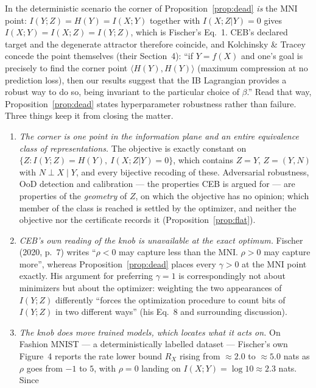 \begin{remark}\label{rem:mni}
In the deterministic scenario the corner of Proposition~\ref{prop:dead} \emph{is} the MNI
point: $I(Y;Z) = H(Y) = I(X;Y)$ together with $I(X;Z|Y) = 0$ gives
$I(X;Y) = I(X;Z) = I(Y;Z)$, which is Fischer's Eq.~1. CEB's declared target and the
degenerate attractor therefore coincide, and Kolchinsky \& Tracey concede the point
themselves (their Section~4): ``if $Y = f(X)$ and one's goal is precisely to find the corner
point $\langle H(Y), H(Y)\rangle$ (maximum compression at no prediction loss), then our
results suggest that the IB Lagrangian provides a robust way to do so, being invariant to
the particular choice of $\beta$.'' Read that way, Proposition~\ref{prop:dead} states
hyperparameter robustness rather than failure. Three things keep it from closing the matter.
\begin{enumerate}
\item[(i)] \emph{The corner is one point in the information plane and an entire equivalence
class of representations.} The objective is exactly constant on
$\{Z : I(Y;Z) = H(Y),\ I(X;Z|Y) = 0\}$, which contains $Z = Y$, $Z = (Y,N)$ with
$N \perp X \mid Y$, and every bijective recoding of these. Adversarial robustness, OoD
detection and calibration --- the properties CEB is argued for --- are properties of the
\emph{geometry} of $Z$, on which the objective has no opinion; which member of the class is
reached is settled by the optimizer, and neither the objective nor the
certificate records it (Proposition~\ref{prop:flat}).
\item[(ii)] \emph{CEB's own reading of the knob is unavailable at the exact optimum.}
Fischer (2020, p.~7) writes ``$\rho < 0$ may capture less than the MNI. $\rho > 0$ may
capture more'', whereas Proposition~\ref{prop:dead} places every $\gamma > 0$ at the MNI
point exactly. His argument for preferring $\gamma = 1$ is correspondingly not about
minimizers but about the optimizer: weighting the two appearances of $I(Y;Z)$ differently
``forces the optimization procedure to count bits of $I(Y;Z)$ in two different ways'' (his
Eq.~8 and surrounding discussion).
\item[(iii)] \emph{The knob does move trained models, which locates what it acts on.} On
Fashion MNIST --- a deterministically labelled dataset --- Fischer's own Figure~4 reports
the rate lower bound $R_X$ rising from $\approx 2.0$ to $\approx 5.0$ nats as $\rho$ goes
from $-1$ to $5$, with $\rho = 0$ landing on $I(X;Y) = \log 10 \approx 2.3$ nats. Since

\end{enumerate}
\end{remark}
